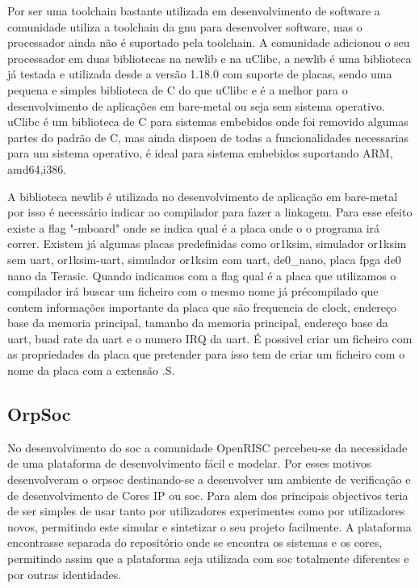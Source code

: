 Por ser uma toolchain bastante utilizada em desenvolvimento de software a comunidade utiliza a toolchain da gnu para desenvolver software, mas o processador ainda não é suportado pela toolchain. A comunidade adicionou o seu processador em duas bibliotecas na newlib e na uClibc, a newlib é uma biblioteca já testada e utilizada desde a versão 1.18.0 com suporte de placas, sendo uma pequena e simples biblioteca de C do que uClibc e é a melhor para o desenvolvimento de aplicações em bare-metal ou seja sem sistema operativo. uClibc é um biblioteca de C para sistemas embebidos onde foi removido algumas partes do padrão de C, mas ainda dispoen de todas a funcionalidades necessarias para um sistema operativo, é ideal para sistema embebidos suportando ARM, amd64,i386.

A biblioteca newlib é utilizada no desenvolvimento de aplicação em bare-metal por isso é necessário indicar ao compilador para fazer a linkagem. Para esse efeito existe a flag "-mboard" onde se indica qual é a placa onde o o programa irá correr. Existem já algumas placas predefinidas como or1ksim, simulador or1ksim sem \acrlong{uart}, or1ksim-uart, simulador or1ksim com \acrshort{uart}, de0\_nano, placa \acrshort{fpga} de0 nano da Terasic. Quando indicamos com a flag qual é a placa que utilizamos o compilador irá buscar um ficheiro com o mesmo nome já précompilado que contem informações importante da placa que são frequencia de clock, endereço base da memoria principal, tamanho da memoria principal, endereço base da \acrshort{uart}, buad rate da \acrshort{uart} e o numero IRQ da \acrshort{uart}. É possivel criar um ficheiro com as propriedades da placa que pretender para isso tem de criar um ficheiro com o nome da placa com a extensão .S. %

\subsection{OrpSoc}
\label{section:orpsoc}
No desenvolvimento do \acrshort{soc} a comunidade OpenRISC percebeu-se da necessidade de uma plataforma de desenvolvimento fácil e modelar. Por esses motivos desenvolveram o \acrlong{orpsoc} destinando-se a desenvolver um ambiente de verificação e de desenvolvimento de Cores IP ou \acrshort{soc}. Para alem dos principais objectivos teria de ser simples de usar tanto por utilizadores experimentes como por utilizadores novos, permitindo este simular e sintetizar o seu projeto facilmente. A plataforma encontrasse separada do repositório onde se encontra os sistemas e os cores, permitindo assim que a plataforma seja utilizada com \acrshort{soc} totalmente diferentes e por outras \textcolor[rgb]{1,0,0}{identidades}.

